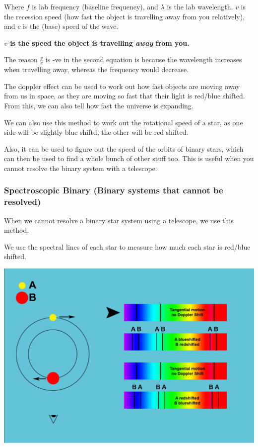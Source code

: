 \documentclass[a4paper, 12pt]{article}
\begin{document}
Where $f$ is lab frequency (baseline frequency), and $\lambda$ is the lab wavelength. $v$ is the recession speed (how fast the object is travelling away from you relatively), and $c$ is the (base) speed of the wave.

\textbf{$v$ is the speed the object is travelling \textit{away} from you.}

The reason $\frac{v}{c}$ is -ve in the second equation is because the wavelength increases when travelling away, whereas the frequency would decrease.

The doppler effect can be used to work out how fast objects are moving away from us in space, as they are moving so fast that their light is red/blue shifted. From this, we can also tell how fast the universe is expanding.

We can also use this method to work out the rotational speed of a star, as one side will be slightly blue shiftd, the other will be red shifted.

Also, it can be used to figure out the speed of the orbits of binary stars, which can then be used to find a whole bunch of other stuff too. This is useful when you cannot resolve the binary system with a telescope.

\subsubsection{Spectroscopic Binary (Binary systems that cannot be resolved)}

When we cannot resolve a binary star system using a telescope, we use this method.

We use the spectral lines of each star to measure how much each star is red/blue shifted.

\newpage
\begin{center}
\includegraphics[height=0.4\textheight]{images/spectralBin1.png}
\end{center}
\end{document}
